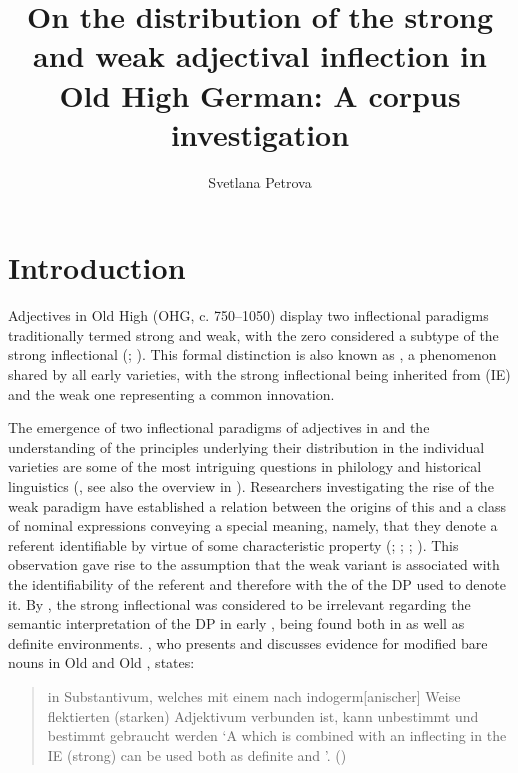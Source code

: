 \documentclass[output=paper,colorlinks,citecolor=brown]{langscibook}
\author{Svetlana Petrova\orcid{}\affiliation{Bergische Universität Wuppertal}}
\title[Strong and weak adjectival inflection in Old High German]{On the distribution of the strong and weak adjectival inflection in Old High German: A corpus investigation}
\begin{document}
\maketitle

\section{Introduction}\label{sec:intro}
\begin{sloppypar}
Adjectives in Old High  (OHG, c. 750–1050) display two inflectional paradigms traditionally termed strong and weak, with the zero  considered a subtype of the strong inflectional  (\cite[170--171]{behaghel1923deutsche}; \cite[298--299]{Braune2018AHD}). This formal distinction is also known as   , a phenomenon shared by all early  varieties, with the strong inflectional  being inherited from  (IE) and the weak one representing a common  innovation.
\end{sloppypar}

The emergence of two inflectional paradigms of adjectives in  and the understanding of the principles underlying their distribution in the individual varieties are some of the most intriguing questions in  philology and historical linguistics (\cite[230]{Bammesberger90}, see also the overview in \cite[60--66]{Rehn2019}). Researchers investigating the rise of the weak paradigm have established a relation between the origins of this  and a class of nominal expressions conveying a special meaning, namely, that they denote a referent identifiable by virtue of some characteristic property (\cite[119--121]{Osthoff1876}; \cite[191--192]{Delbruck09}; \cite[171]{behaghel1923deutsche}; \cite[297]{Braune2018AHD}). This observation gave rise to the assumption that the weak variant is associated with the identifiability of the referent and therefore with the  of the DP used to denote it. By , the strong inflectional  was considered to be irrelevant regarding the semantic interpretation of the DP in early , being found both in  as well as definite environments. \citet[189--190]{Delbruck09}, who presents and discusses  evidence for modified bare nouns in Old  and Old , states:

\begin{quotation}\relax
[E]in Substantivum, welches mit einem nach indogerm[anischer] Weise flektierten (starken) Adjektivum verbunden ist, kann unbestimmt und bestimmt gebraucht werden
\glt `A  which is combined with an  inflecting in the IE (strong)  can be used both as definite and '. (\cite[189]{Delbruck09})
\end{quotation}
\end{document}
